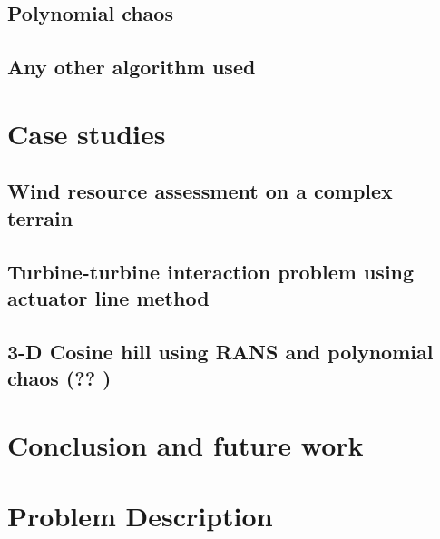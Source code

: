 \documentclass[]{aiaa-tc}%
\begin{document}
\subsection{Polynomial chaos}
\subsection{Any other algorithm used}

\section{Case studies}
\subsection{Wind resource assessment on a complex terrain}
\subsection{Turbine-turbine interaction problem using actuator line method}
\subsection{3-D Cosine hill using RANS and polynomial chaos (?? )} \label{cosineHill}


\section{Conclusion and future work}


\section{Problem Description}
\end{document}
